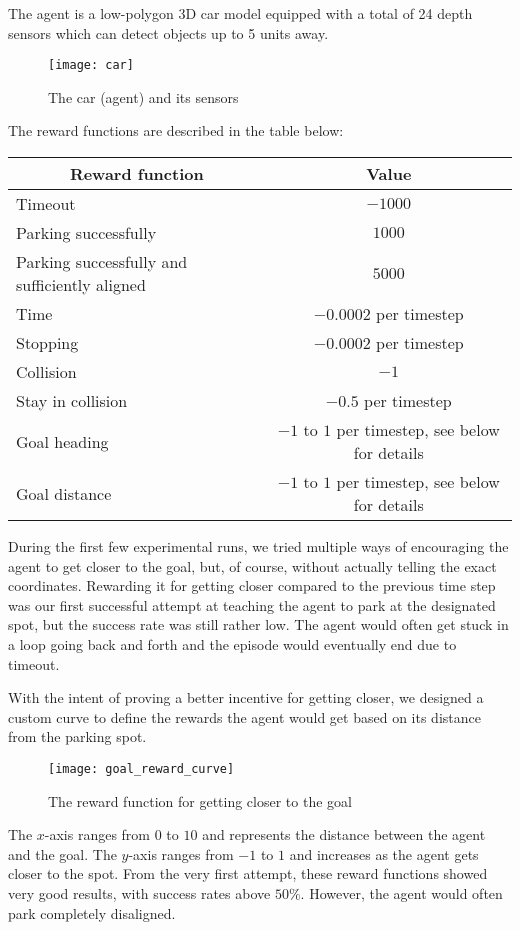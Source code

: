 The agent is a low-polygon 3D car model equipped with a total of 24 depth sensors which can detect objects up to 5 units away.
\begin{figure}[H]
    \texttt{[image: car]}
    \caption{The car (agent) and its sensors}
\end{figure}
The reward functions are described in the table below:
\begin{table}[H]
\begin{tabular}{|l|c|}
\hline \multicolumn{1}{|c|}{ Reward function } & Value \\
\hline Timeout & $-1000$ \\
\hline Parking successfully & $1000$ \\
\hline Parking successfully and sufficiently aligned & $5000$ \\
\hline Time & $-0.0002$ per timestep \\
\hline Stopping & $-0.0002$ per timestep \\
\hline Collision & $-1$ \\
\hline Stay in collision & $-0.5$ per timestep \\
\hline Goal heading & $-1$ to $1$ per timestep, see below for details\\
\hline Goal distance & $-1$ to $1$ per timestep, see below for details\\
\hline
\end{tabular}
\end{table}
During the first few experimental runs, we tried multiple ways of encouraging the agent to get closer to the goal, but, of course, without actually telling the exact coordinates. Rewarding it for getting closer compared to the previous time step was our first successful attempt at teaching the agent to park at the designated spot, but the success rate was still rather low. The agent would often get stuck in a loop going back and forth and the episode would eventually end due to timeout.

With the intent of proving a better incentive for getting closer, we designed a custom curve to define the rewards the agent would get based on its distance from the parking spot.
\begin{figure}[H]
    \texttt{[image: goal\_reward\_curve]}
    \caption{The reward function for getting closer to the goal}
    \label{fig:goaldist}
\end{figure}
The $x$-axis ranges from $0$ to $10$ and represents the distance between the agent and the goal. The $y$-axis ranges from $-1$ to $1$ and increases as the agent gets closer to the spot. From the very first attempt, these reward functions showed very good results, with success rates above $50\%$. However, the agent would often park completely disaligned.

